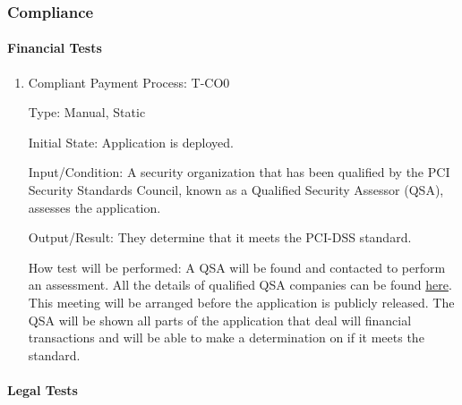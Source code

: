 \documentclass[12pt, titlepage]{article}
\begin{document}
\subsubsection{Compliance}

\paragraph{Financial Tests}

\begin{enumerate}

    \item{Compliant Payment Process: T-CO0\\}

    Type: Manual, Static
                        
    Initial State: Application is deployed.
                        
    Input/Condition: A security organization that has been qualified by the PCI Security Standards Council, known as a Qualified Security Assessor (QSA), assesses the application.
                        
    Output/Result: They determine that it meets the PCI-DSS standard.
                        
    How test will be performed: A QSA will be found and contacted to perform an assessment. All the details of qualified QSA companies can be found \href{https://listings.pcisecuritystandards.org/assessors_and_solutions/qualified_security_assessors}{here}. 
    This meeting will be arranged before the application is publicly released. The QSA will be shown all parts of the application that deal will financial transactions and will be able to make a determination on if it meets the standard.

\end{enumerate}
		
\paragraph{Legal Tests}
\end{document}
